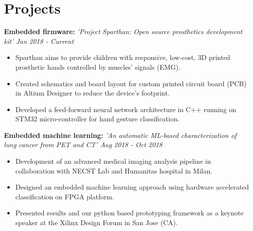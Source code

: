 \documentclass[11pt,letterpaper,sans]{moderncv}
\begin{document}
       \vspace{-13pt}
        
    \section{Projects}
    \vspace{-2pt}
        
        \textbf{Embedded firmware:} \textit{'Project Sparthan: Open source prosthetics development kit'
        \hspace*{\fill} Jan 2018 - Current}
        {
        \begin{itemize}
            \item Sparthan aims to provide children with responsive, low-cost, 3D printed prosthetic hands controlled by muscles' signals (EMG).
            \item Created schematics and board layout for custom printed circuit board (PCB) in Altium Designer to reduce the device's footprint.
            \item Developed a feed-forward neural network architecture in C++ running on STM32 micro-controller for hand gesture classification.
        \end{itemize}
        }
        \vspace{2pt}
        
        
        
        \textbf{Embedded machine learning:} \textit{'An automatic ML-based characterization of lung cancer from  PET and CT'  
        \hspace*{\fill} Aug 2018 - Oct 2018}
        \small{\begin{itemize}
            \item Development of an advanced medical imaging analysis pipeline in collaboration with NECST Lab and Humanitas hospital in Milan.
            \item Designed an embedded machine learning approach using hardware accelerated classification on FPGA platform.
            \item Presented results and our python based prototyping framework as a keynote speaker at the Xilinx Design Forum in San Jose (CA).
        \end{itemize}}
\end{document}
